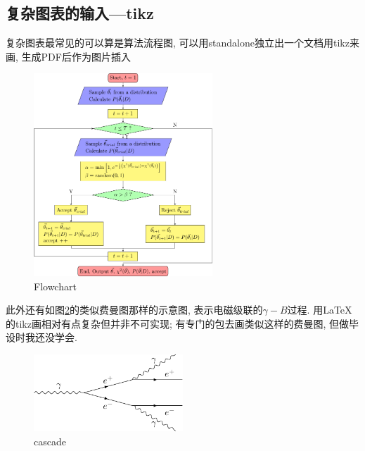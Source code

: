 \documentclass[a4paper]{article}
\begin{document}
\begin{spacing}{1.5}
\subsection{复杂图表的输入---tikz}
\label{sec:tikz}
复杂图表最常见的可以算是算法流程图, 可以用standalone独立出一个文档用tikz来画, 生成PDF后作为图片插入
\begin{figure}[ht]
\centering
\includegraphics[width=0.6\textwidth]{images/Chap2/Flowchart.pdf}
\caption{Flowchart}
\label{Flowchart}
\end{figure}

\noindent 此外还有如图\ref{cascade}的类似费曼图那样的示意图, 表示电磁级联的$\gamma-B$过程. 用\LaTeX 的tikz画相对有点复杂但并非不可实现; 有专门的包去画类似这样的费曼图, 但做毕设时我还没学会.
\begin{figure}[ht]
\centering
\includegraphics[width=0.5\textwidth]{images/Chap2/cascade.pdf}
\caption{cascade}
\label{cascade}
\end{figure}


\end{spacing}
\end{document}
